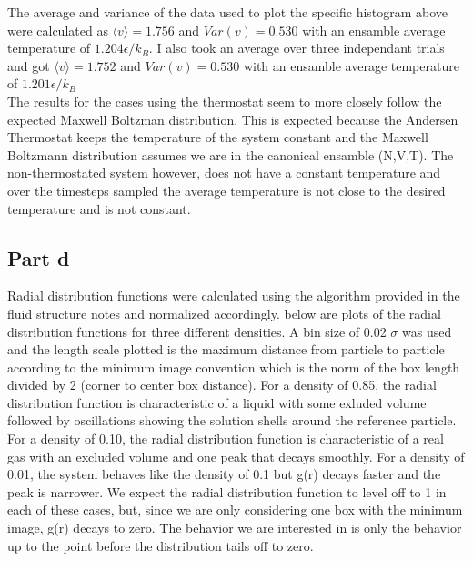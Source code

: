 \documentclass{article}
\begin{document}
	The average and variance of the data used to plot the specific histogram above were calculated as $\langle v \rangle = 1.756$ and $Var(v) = 0.530$ with an ensamble average temperature of $1.204 \epsilon / k_B$. I also took an average over three independant trials and got $\langle v \rangle = 1.752$ and $Var(v) = 0.530$ with an ensamble average temperature of $1.201 \epsilon / k_B$  \\

	The results for the cases using the thermostat seem to more closely follow the expected Maxwell Boltzman distribution. This is expected because the Andersen Thermostat keeps the temperature of the system constant and the Maxwell Boltzmann distribution assumes we are in the canonical ensamble (N,V,T). The non-thermostated system however, does not have a constant temperature and over the timesteps sampled the average temperature is not close to the desired temperature and is not constant.

\subsection*{Part d}

	Radial distribution functions were calculated using the algorithm provided in the fluid structure notes and normalized accordingly. below are plots of the radial distribution functions for three different densities. A bin size of 0.02 $\sigma$ was used and the length scale plotted is the maximum distance from particle to particle according to the minimum image convention which is the norm of the box length divided by 2 (corner to center box distance). For a density of 0.85, the radial distribution function is characteristic of a liquid with some exluded volume followed by oscillations showing the solution shells around the reference particle. For a density of 0.10, the radial distribution function is characteristic of a real gas with an excluded volume and one peak that decays smoothly. For a density of 0.01, the system behaves like the density of 0.1 but g(r) decays faster and the peak is narrower. We expect the radial distribution function to level off to 1 in each of these cases, but, since we are only considering one box with the minimum image, g(r) decays to zero. The behavior we are interested in is only the behavior up to the point before the distribution tails off to zero.
\end{document}
